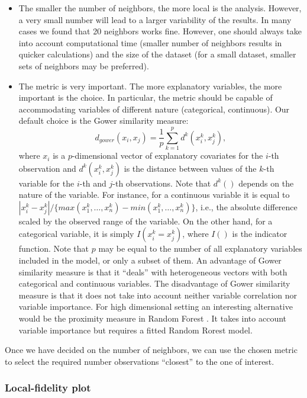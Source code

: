 \documentclass[12pt,]{krantz}
\providecommand{\tightlist}{%
  \setlength{\itemsep}{0pt}\setlength{\parskip}{0pt}}
\begin{document}
\begin{itemize}
\tightlist
\item
  The smaller the number of neighbors, the more local is the analysis. However, a very small number will lead to a larger variability of the results. In many cases we found that 20 neighbors works fine. However, one should always take into account computational time (smaller number of neighbors results in quicker calculations) and the size of the dataset (for a small dataset, smaller sets of neighbors may be preferred).
\item
  The metric is very important. The more explanatory variables, the more important is the choice. In particular, the metric should be capable of accommodating variables of different nature (categorical, continuous). Our default choice is the Gower similarity measure:
  \[
  d_{gower}(x_i, x_j) = \frac 1p \sum_{k=1}^p d^k(x_i^k, x_j^k),
  \]
  where \(x_i\) is a \(p\)-dimensional vector of explanatory covariates for the \(i\)-th observation and \(d^k(x_i^k,x_j^k)\) is the distance between values of the \(k\)-th variable for the \(i\)-th and \(j\)-th observations. Note that \(d^k()\) depends on the nature of the variable. For instance, for a continuous variable it is equal to \(|x_i^k-x_j^k|/\{max(x_1^k,\ldots,x_n^k)-min(x_1^k,\ldots,x_n^k)\}\), i.e., the absolute difference scaled by the observed range of the variable. On the other hand, for a categorical variable, it is simply \(I(x_i^k = x_j^k)\), where \(I()\) is the indicator function. Note that \(p\) may be equal to the number of all explanatory variables included in the model, or only a subset of them. An advantage of Gower similarity measure is that it ``deals'' with heterogeneous vectors with both categorical and continuous variables.
  The disadvantage of Gower similarity measure is that it does not take into account neither variable correlation nor variable importance. For high dimensional setting an interesting alternative would be the proximity measure in Random Forest \citep{randomForestBreiman}. It takes into account variable importance but requires a fitted Random Rorest model.
\end{itemize}

Once we have decided on the number of neighbors, we can use the chosen metric to select the required number observations ``closest'' to the one of interest.

\hypertarget{cPLocDiagLFplot}{%
\subsubsection{Local-fidelity plot}\label{cPLocDiagLFplot}}
\end{document}
